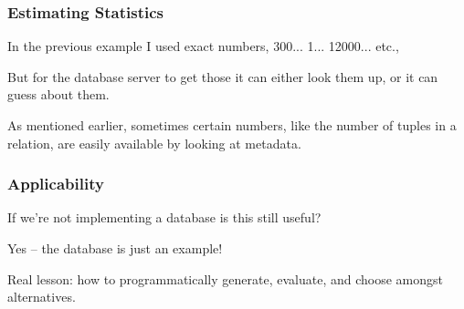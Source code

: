 \begin{frame}
\frametitle{Estimating Statistics}

In the previous example I used exact numbers, 300... 1... 12000... etc.,

But for the database server to get those it can either look them up, or it can guess about them. 

As mentioned earlier, sometimes certain numbers, like the number of tuples in a relation, are easily available by looking at metadata. 

\end{frame}


\begin{frame}
\frametitle{Applicability}

If we're not implementing a database is this still useful?

Yes -- the database is just an example!

Real lesson: how to programmatically generate, evaluate, and choose amongst alternatives.

\end{frame}




